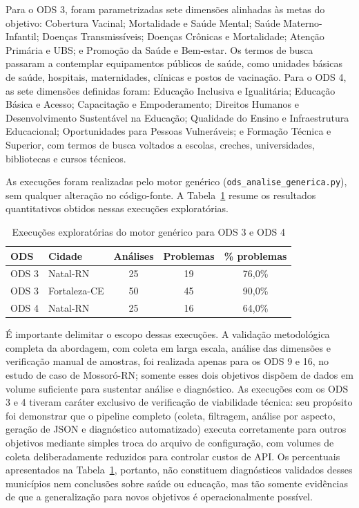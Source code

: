 Para o ODS 3, foram parametrizadas sete dimensões alinhadas às metas do objetivo: Cobertura Vacinal; Mortalidade e Saúde Mental; Saúde Materno-Infantil; Doenças Transmissíveis; Doenças Crônicas e Mortalidade; Atenção Primária e UBS; e Promoção da Saúde e Bem-estar. Os termos de busca passaram a contemplar equipamentos públicos de saúde, como unidades básicas de saúde, hospitais, maternidades, clínicas e postos de vacinação. Para o ODS 4, as sete dimensões definidas foram: Educação Inclusiva e Igualitária; Educação Básica e Acesso; Capacitação e Empoderamento; Direitos Humanos e Desenvolvimento Sustentável na Educação; Qualidade do Ensino e Infraestrutura Educacional; Oportunidades para Pessoas Vulneráveis; e Formação Técnica e Superior, com termos de busca voltados a escolas, creches, universidades, bibliotecas e cursos técnicos.

As execuções foram realizadas pelo motor genérico (\texttt{ods\_analise\_generica.py}), sem qualquer alteração no código-fonte. A Tabela~\ref{tab:generalizacao-ods} resume os resultados quantitativos obtidos nessas execuções exploratórias.

\begin{table}[h!]
    \centering
    \caption{Execuções exploratórias do motor genérico para ODS 3 e ODS 4}
    \label{tab:generalizacao-ods}
    \begin{tabular}{llccc}
        \hline
        \textbf{ODS} & \textbf{Cidade} & \textbf{Análises} & \textbf{Problemas} & \textbf{\% problemas} \\
        \hline
        ODS 3 & Natal-RN & 25 & 19 & 76,0\% \\
        ODS 3 & Fortaleza-CE & 50 & 45 & 90,0\% \\
        ODS 4 & Natal-RN & 25 & 16 & 64,0\% \\
        \hline
    \end{tabular}
\end{table}

É importante delimitar o escopo dessas execuções. A validação metodológica completa da abordagem, com coleta em larga escala, análise das dimensões e verificação manual de amostras, foi realizada apenas para os ODS 9 e 16, no estudo de caso de Mossoró-RN; somente esses dois objetivos dispõem de dados em volume suficiente para sustentar análise e diagnóstico. As execuções com os ODS 3 e 4 tiveram caráter exclusivo de verificação de viabilidade técnica: seu propósito foi demonstrar que o pipeline completo (coleta, filtragem, análise por aspecto, geração de JSON e diagnóstico automatizado) executa corretamente para outros objetivos mediante simples troca do arquivo de configuração, com volumes de coleta deliberadamente reduzidos para controlar custos de API. Os percentuais apresentados na Tabela~\ref{tab:generalizacao-ods}, portanto, não constituem diagnósticos validados desses municípios nem conclusões sobre saúde ou educação, mas tão somente evidências de que a generalização para novos objetivos é operacionalmente possível.

